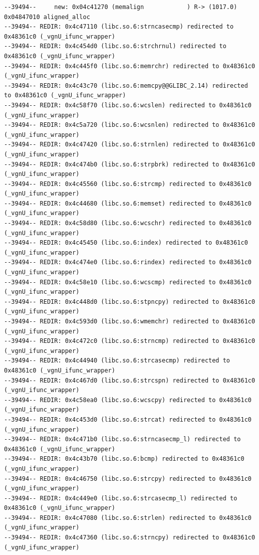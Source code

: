 \documentclass[a4paper,11pt]{article}
\begin{document}
\begin{lstlisting}
--39494--     new: 0x04c41270 (memalign            ) R-> (1017.0) 0x04847010 aligned_alloc
--39494-- REDIR: 0x4c47110 (libc.so.6:strncasecmp) redirected to 0x48361c0 (_vgnU_ifunc_wrapper)
--39494-- REDIR: 0x4c454d0 (libc.so.6:strchrnul) redirected to 0x48361c0 (_vgnU_ifunc_wrapper)
--39494-- REDIR: 0x4c445f0 (libc.so.6:memrchr) redirected to 0x48361c0 (_vgnU_ifunc_wrapper)
--39494-- REDIR: 0x4c43c70 (libc.so.6:memcpy@@GLIBC_2.14) redirected to 0x48361c0 (_vgnU_ifunc_wrapper)
--39494-- REDIR: 0x4c58f70 (libc.so.6:wcslen) redirected to 0x48361c0 (_vgnU_ifunc_wrapper)
--39494-- REDIR: 0x4c5a720 (libc.so.6:wcsnlen) redirected to 0x48361c0 (_vgnU_ifunc_wrapper)
--39494-- REDIR: 0x4c47420 (libc.so.6:strnlen) redirected to 0x48361c0 (_vgnU_ifunc_wrapper)
--39494-- REDIR: 0x4c474b0 (libc.so.6:strpbrk) redirected to 0x48361c0 (_vgnU_ifunc_wrapper)
--39494-- REDIR: 0x4c45560 (libc.so.6:strcmp) redirected to 0x48361c0 (_vgnU_ifunc_wrapper)
--39494-- REDIR: 0x4c44680 (libc.so.6:memset) redirected to 0x48361c0 (_vgnU_ifunc_wrapper)
--39494-- REDIR: 0x4c58d80 (libc.so.6:wcschr) redirected to 0x48361c0 (_vgnU_ifunc_wrapper)
--39494-- REDIR: 0x4c45450 (libc.so.6:index) redirected to 0x48361c0 (_vgnU_ifunc_wrapper)
--39494-- REDIR: 0x4c474e0 (libc.so.6:rindex) redirected to 0x48361c0 (_vgnU_ifunc_wrapper)
--39494-- REDIR: 0x4c58e10 (libc.so.6:wcscmp) redirected to 0x48361c0 (_vgnU_ifunc_wrapper)
--39494-- REDIR: 0x4c448d0 (libc.so.6:stpncpy) redirected to 0x48361c0 (_vgnU_ifunc_wrapper)
--39494-- REDIR: 0x4c593d0 (libc.so.6:wmemchr) redirected to 0x48361c0 (_vgnU_ifunc_wrapper)
--39494-- REDIR: 0x4c472c0 (libc.so.6:strncmp) redirected to 0x48361c0 (_vgnU_ifunc_wrapper)
--39494-- REDIR: 0x4c44940 (libc.so.6:strcasecmp) redirected to 0x48361c0 (_vgnU_ifunc_wrapper)
--39494-- REDIR: 0x4c467d0 (libc.so.6:strcspn) redirected to 0x48361c0 (_vgnU_ifunc_wrapper)
--39494-- REDIR: 0x4c58ea0 (libc.so.6:wcscpy) redirected to 0x48361c0 (_vgnU_ifunc_wrapper)
--39494-- REDIR: 0x4c453d0 (libc.so.6:strcat) redirected to 0x48361c0 (_vgnU_ifunc_wrapper)
--39494-- REDIR: 0x4c471b0 (libc.so.6:strncasecmp_l) redirected to 0x48361c0 (_vgnU_ifunc_wrapper)
--39494-- REDIR: 0x4c43b70 (libc.so.6:bcmp) redirected to 0x48361c0 (_vgnU_ifunc_wrapper)
--39494-- REDIR: 0x4c46750 (libc.so.6:strcpy) redirected to 0x48361c0 (_vgnU_ifunc_wrapper)
--39494-- REDIR: 0x4c449e0 (libc.so.6:strcasecmp_l) redirected to 0x48361c0 (_vgnU_ifunc_wrapper)
--39494-- REDIR: 0x4c47080 (libc.so.6:strlen) redirected to 0x48361c0 (_vgnU_ifunc_wrapper)
--39494-- REDIR: 0x4c47360 (libc.so.6:strncpy) redirected to 0x48361c0 (_vgnU_ifunc_wrapper)

\end{lstlisting}
\end{document}
